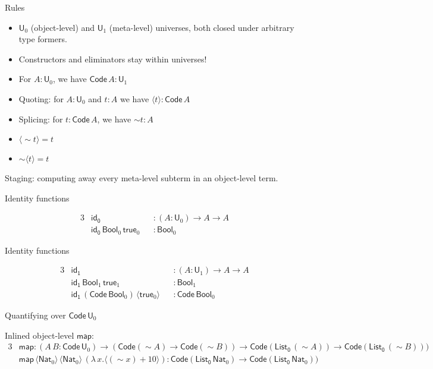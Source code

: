 \documentclass[dvipsnames,10pt,aspectratio=169]{beamer}
\renewcommand{\U}{\mathsf{U}}
\newcommand{\Nat}{\mathsf{Nat}}
\newcommand{\Bool}{\mathsf{Bool}}
\newcommand{\true}{\mathsf{true}}
\newcommand{\Code}{\mathsf{Code}}
\newcommand{\msf}[1]{\mathsf{#1}}
\newcommand{\qtm}[1]{\langle #1\rangle}
\begin{document}
\begin{frame}[fragile]{Rules}

\begin{itemize}
    \item $\U_0$ (object-level) and $\U_1$ (meta-level) universes, both closed
      under arbitrary type formers.
    \item Constructors and eliminators \alert{stay within} universes!
    \pause
    \item For $A : \U_0$, we have $\Code\,A : \U_1$
    \pause
    \item Quoting: for $A : \U_0$ and $t : A$ we have $\qtm{t} : \Code\,A$
    \pause
    \item Splicing: for $t : \Code\,A$, we have $\sim\!t : A$
    \pause
    \item $\qtm{\sim\!t} = t$
    \item $\sim\!\qtm{t} = t$
\end{itemize}
\vspace{1em}
\pause

Staging: computing away every meta-level subterm in an object-level term.
\end{frame}

\begin{frame}{Identity functions}

\begin{alignat*}{3}
  &\msf{id_0} &&: (A : \U_0) \to A \to A\\
  &\msf{id_0}\,\Bool_0\,\true_0 &&: \Bool_0
\end{alignat*}
\end{frame}

\begin{frame}{Identity functions}

\begin{alignat*}{3}
  &\msf{id_1} &&: (A : \U_1) \to A \to A\\
  &\msf{id_1}\,\Bool_1\,\true_1 &&: \Bool_1\\
  &\msf{id_1}\,(\Code\,\Bool_0)\,\qtm{\true_0} &&: \Code\,\Bool_0
\end{alignat*}
\end{frame}

\begin{frame}{Quantifying over $\Code\,\U_0$}

Inlined object-level $\msf{map}$:
\begin{alignat*}{3}
  &\msf{map} : (A\,B : \Code\,\U_0) \to (\Code(\sim\!A) \to \Code(\sim\!B)) \to \Code(\msf{List_0}\,(\sim\!A)) \to \Code(\msf{List_0}\,(\sim\!B)))\\
  & \msf{map}\,\qtm{\Nat_0}\,\qtm{\Nat_0}\,(\lambda\,x. \qtm{(\sim\!x) + 10}) : \Code(\msf{List_0}\,\Nat_0) \to \Code(\msf{List_0}\,\Nat_0))
\end{alignat*}
\end{frame}
\end{document}
